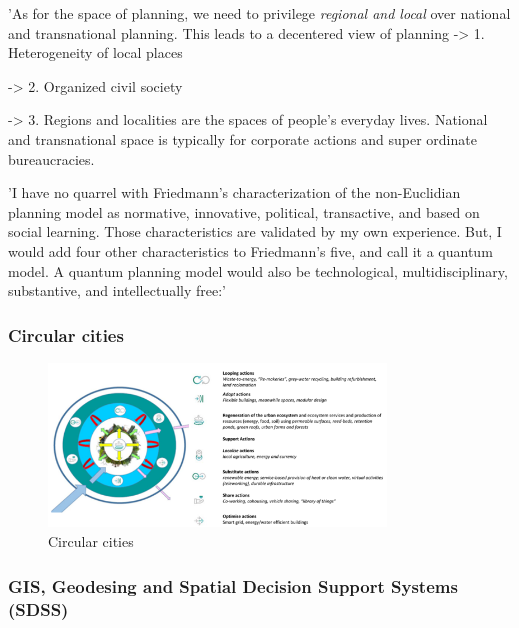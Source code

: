 'As for the space of planning, we need to privilege \textit{regional and local} over national and transnational planning. This leads to a decentered view of planning 
-> 1. Heterogeneity of local places \par
-> 2. Organized civil society \par
-> 3. Regions and localities are the spaces of people's everyday lives. National and transnational space is typically for corporate actions and super ordinate bureaucracies.\par






\parencite{Casella2007}
'I have no quarrel with Friedmann’s characterization
of the non-Euclidian planning model as normative, innovative, political, transactive, and based on social learning. Those characteristics are validated by my own experience. But, I would add four other characteristics to Friedmann’s five, and call it a quantum model. A quantum planning model would also be technological, multidisciplinary, substantive, and intellectually free:'






\subsubsection{Circular cities}



\begin{figure}[h!]
    \centering
    \includegraphics[width=0.8\textwidth]{sections/asset/city.PNG}
    \caption{Circular cities}
    \label{fig:research objectives}
\end{figure}






\subsubsection{GIS, Geodesing and Spatial Decision Support Systems (SDSS)}


